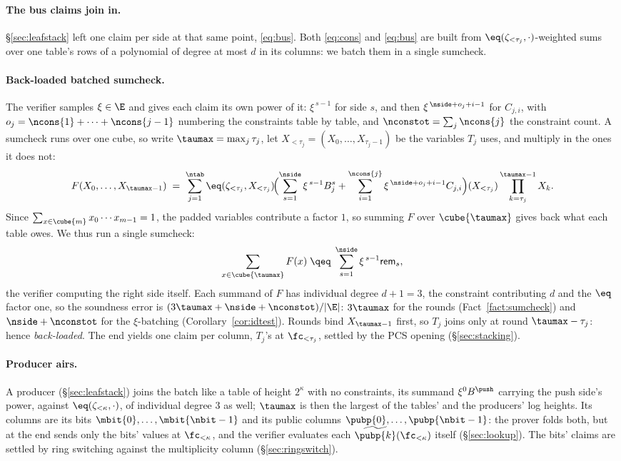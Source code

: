 \paragraph{The bus claims join in.} \S\ref{sec:leafstack} left one claim per side at that same point, \eqref{eq:bus}. Both \eqref{eq:cons} and \eqref{eq:bus} are built from $\eq(\zeta_{<\tau_j},\cdot)$-weighted sums over one table's rows of a polynomial of degree at most $d$ in its columns: we batch them in a single sumcheck.

\paragraph{Back-loaded batched sumcheck.} The verifier samples $\xi\in\E$ and gives each claim its own power of it: $\xi^{\,s-1}$ for side $s$, and then $\xi^{\,\nside+o_j+i-1}$ for $C_{j,i}$, with $o_j=\ncons{1}+\dots+\ncons{j-1}$ numbering the constraints table by table, and $\nconstot=\sum_j\ncons{j}$ the constraint count. A sumcheck runs over one cube, so write $\taumax=\max_j\tau_j$, let $X_{<\tau_j}=(X_0,\dots,X_{\tau_j-1})$ be the variables $T_j$ uses, and multiply in the ones it does not:
\[
  F(X_0,\dots,X_{\taumax-1})\;=\;\sum_{j=1}^{\ntab}\eq(\zeta_{<\tau_j},X_{<\tau_j})\!
  \Bigl(\sum_{s=1}^{\nside}\xi^{\,s-1}B^{s}_j+\sum_{i=1}^{\ncons{j}}\xi^{\,\nside+o_j+i-1}C_{j,i}\Bigr)(X_{<\tau_j})
  \prod_{k=\tau_j}^{\taumax-1}X_k .
\]
Since $\sum_{x\in\cube{m}}x_0\cdots x_{m-1}=1$, the padded variables contribute a factor $1$, so summing $F$ over $\cube{\taumax}$ gives back what each table owes. We thus run a single sumcheck:
\[
  \sum_{x\in\cube{\taumax}}F(x)\;\qeq\;\sum_{s=1}^{\nside}\xi^{\,s-1}\mathsf{rem}_{s},
\]
the verifier computing the right side itself. Each summand of $F$ has individual degree $d+1=3$, the constraint contributing $d$ and the $\eq$ factor one, so the soundness error is $(3\taumax+\nside+\nconstot)/|\E|$: $3\taumax$ for the rounds (Fact~\ref{fact:sumcheck}) and $\nside+\nconstot$ for the $\xi$-batching (Corollary~\ref{cor:idtest}). Rounds bind $X_{\taumax-1}$ first, so $T_j$ joins only at round $\taumax-\tau_j$: hence \emph{back-loaded}. The end yields one claim per column, $T_j$'s at $\fc_{<\tau_j}$, settled by the PCS opening (\S\ref{sec:stacking}).

\paragraph{Producer airs.} A producer (\S\ref{sec:leafstack}) joins the batch like a table of height $2^{\kappa}$ with no constraints, its summand $\xi^{0}B^{\push}$ carrying the push side's power, against $\eq(\zeta_{<\kappa},\cdot)$, of individual degree $3$ as well; $\taumax$ is then the largest of the tables' and the producers' log heights. Its columns are its bits $\mbit{0},\dots,\mbit{\nbit-1}$ and its public columns $\pubp{0},\dots,\pubp{\nbit-1}$: the prover folds both, but at the end sends only the bits' values at $\fc_{<\kappa}$, and the verifier evaluates each $\widetilde{\pubp{k}}(\fc_{<\kappa})$ itself (\S\ref{sec:lookup}). The bits' claims are settled by ring switching against the multiplicity column (\S\ref{sec:ringswitch}).

